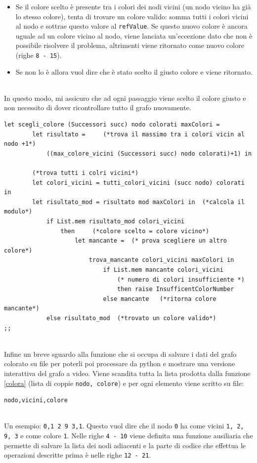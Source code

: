 \begin{itemize}
	\item Se il colore scelto è presente tra i colori dei nodi vicini (un nodo vicino ha già lo stesso colore), tenta di trovare un colore valido: somma tutti i colori vicini al nodo e sottrae questo valore al \lstinline[style=cmd]|refValue|. Se questo nuovo colore è ancora uguale ad un colore vicino al nodo, viene lanciata un'eccezione dato che non è possibile risolvere il problema, altrimenti viene ritornato come nuovo colore (righe \lstinline[style=cmd]|8 - 15|).
	\item Se non lo è allora vuol dire che è stato scelto il giusto colore e viene ritornato.
\end{itemize}
\ \\
In questo modo, mi assicuro che ad ogni passaggio viene scelto il colore giusto e non necessito di dover ricontrollare tutto il grafo nuovamente.
\begin{lstlisting}[style=camlt, caption={Funzione ausiliaria a \autoref{colora} che sceglie un colore per il nodo (se possibile).}]
	let scegli_colore (Successori succ) nodo colorati maxColori = 
		let risultato = 	(*trova il massimo tra i colori vicin al nodo +1*)
			((max_colore_vicini (Successori succ) nodo colorati)+1) in
		
		(*trova tutti i colri vicini*)
		let colori_vicini = tutti_colori_vicini (succ nodo) colorati in            
		let risultato_mod = risultato mod maxColori in  (*calcola il modulo*)
			if List.mem risultato_mod colori_vicini  
				then 	 (*colore scelto = colore vicino*)
					let mancante = 	(* prova scegliere un altro colore*)
						trova_mancante colori_vicini maxColori in     
							if List.mem mancante colori_vicini 
								(* numero di colori insufficiente *)
								then raise InsufficentColorNumber                             
							else mancante	(*ritorna colore mancante*)
			else risultato_mod	(*trovato un colore valido*)
;;
\end{lstlisting}
\ \\
Infine un breve sguardo alla funzione che si occupa di salvare i dati del grafo colorato su file per poterli poi processare da python e mostrare una versione interattiva del grafo a video. Viene scandita tutta la lista prodotta dalla funzione \autoref{colora} (lista di coppie \lstinline[style=cmd]|nodo, colore|) e per ogni elemento viene scritto  su file: 

\begin{center}
	\lstinline[style=cmd]|nodo,vicini,colore|
\end{center}
\ \\
Un esempio: \lstinline[style=cmd]|0,1 2 9 3,1|. Questo vuol dire che il nodo \lstinline[style=cmd]|0| ha come vicini \lstinline[style=cmd]|1, 2, 9, 3| e come colore \lstinline[style=cmd]|1|. Nelle righe \lstinline[style=cmd]|4 - 10| viene definita una funzione ausiliaria che permette di salvare la lista dei nodi adiacenti e la parte di codice che effettua le operazioni descritte prima è nelle righe \lstinline[style=cmd]|12 - 21|.


